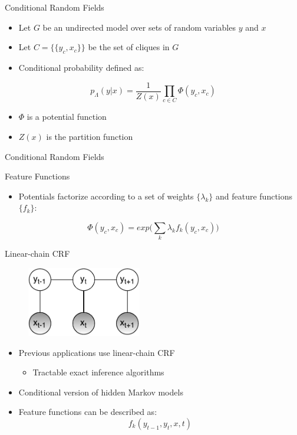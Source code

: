 \documentclass[presentation,bigger]{beamer}
\begin{document}
\begin{frame}[label={sec:orgheadline5}]{Conditional Random Fields}
\begin{definition}
\begin{itemize}
\item Let \(G\) be an undirected model over sets of random variables \(y\) and \(x\)
\item Let \(C = \{\{y_c, x_c\}\}\) be the set of cliques in \(G\)
\item Conditional probability defined as:
\end{itemize}
\[ p_\Lambda(y|x) = \dfrac{1}{Z(x)}\prod_{c \in C} \Phi (y_c, x_c) \]
\begin{itemize}
\item \(\Phi\) is a potential function
\item \(Z(x)\) is the partition function
\end{itemize}
\end{definition}
\end{frame}
\begin{frame}[label={sec:orgheadline6}]{Conditional Random Fields}
\begin{block}{Feature Functions}
\begin{itemize}
\item Potentials factorize according to a set of weights \(\{\lambda_k\}\) and feature functions \(\{f_k\}\):
\end{itemize}
\[ \Phi(y_c,x_c) = exp\Bigg(\sum_k \lambda_kf_k(y_c,x_c)\Bigg) \]
\end{block}
\end{frame}
\begin{frame}[label={sec:orgheadline7}]{Linear-chain CRF}
\begin{figure}[htb]
\centering
\includegraphics[width=5cm]{figures/LCRF.pdf}
\end{figure}
\begin{itemize}
\item Previous applications use linear-chain CRF
\begin{itemize}
\item Tractable exact inference algorithms
\end{itemize}
\item Conditional version of hidden Markov models
\item Feature functions can be described as:
\[ f_k(y_{t-1},y_t,x,t) \]
\end{itemize}
\end{frame}
\end{document}
